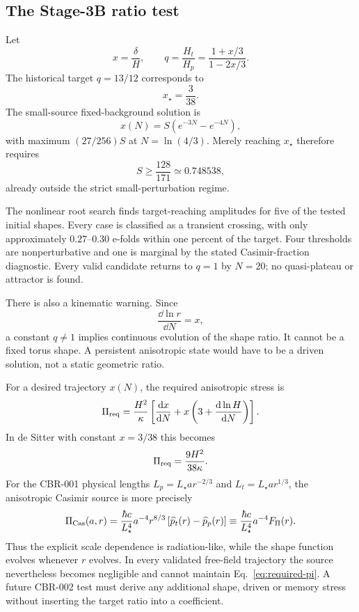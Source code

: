 \subsection{The Stage-3B ratio test}

Let
\begin{equation}
 x=\frac{\delta}{H},
 \qquad
 q=\frac{H_t}{H_p}=\frac{1+x/3}{1-2x/3}.
 \label{eq:q-x}
\end{equation}
The historical target $q=13/12$ corresponds to
\begin{equation}
 x_\star=\frac{3}{38}.
\end{equation}
The small-source fixed-background solution is
\begin{equation}
 x(N)=S\left(e^{-3N}-e^{-4N}\right),
\end{equation}
with maximum $(27/256)S$ at $N=\ln(4/3)$.  Merely reaching $x_\star$ therefore
requires
\begin{equation}
 S\ge\frac{128}{171}\simeq0.748538,
\end{equation}
already outside the strict small-perturbation regime.

The nonlinear root search finds target-reaching amplitudes for five of the
tested initial shapes.  Every case is classified as a transient crossing,
with only approximately $0.27$--$0.30$ e-folds within one percent of the
target.  Four thresholds are nonperturbative and one is marginal by the stated
Casimir-fraction diagnostic.  Every valid candidate returns to $q=1$ by
$N=20$; no quasi-plateau or attractor is found.

There is also a kinematic warning.  Since
\begin{equation}
 \frac{\dd\ln r}{\dd N}=x,
\end{equation}
a constant $q\ne1$ implies continuous evolution of the shape ratio.  It cannot
be a fixed torus shape.  A persistent anisotropic state would have to be a
driven solution, not a static geometric ratio.

For a desired trajectory $x(N)$, the required anisotropic stress is
\begin{equation}
 \Pi_{\rm req}=\frac{H^2}{\kappa}
 \left[\frac{\mathrm d x}{\mathrm d N}
 +x\left(3+\frac{\mathrm d\ln H}{\mathrm d N}\right)\right].
 \label{eq:required-pi}
\end{equation}
In de Sitter with constant $x=3/38$ this becomes
\begin{equation}
 \Pi_{\rm req}=\frac{9H^2}{38\kappa}.
\end{equation}
For the CBR-001 physical lengths
$L_p=L_\star a r^{-2/3}$ and $L_t=L_\star a r^{1/3}$, the anisotropic Casimir
source is more precisely
\begin{equation}
 \Pi_{\rm Cas}(a,r)=\frac{\hbar c}{L_\star^4}a^{-4}
 r^{8/3}\left[\widehat p_t(r)-\widehat p_p(r)\right]
 \equiv\frac{\hbar c}{L_\star^4}a^{-4}F_\Pi(r).
 \label{eq:casimir-pi-scaling}
\end{equation}
Thus the explicit scale dependence is radiation-like, while the shape
function evolves whenever $r$ evolves.  In every validated free-field
trajectory the source nevertheless becomes negligible and cannot maintain
Eq.~\eqref{eq:required-pi}.  A future CBR-002 test must derive any additional
shape, driven or memory stress without inserting the target ratio into a
coefficient.
